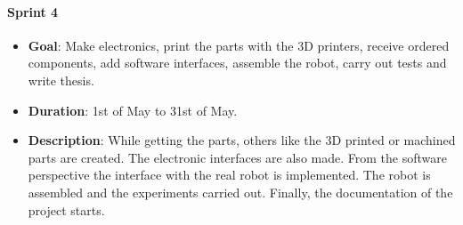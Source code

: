 \paragraph{\textbf{Sprint 4}}
  \begin{itemize}
    \item \textbf{Goal}: Make electronics, print the parts with the 3D printers, receive ordered components, add software interfaces, assemble the robot, carry out tests and write thesis.
    \item \textbf{Duration}: 1st of May to 31st of May.
    \item \textbf{Description}: While getting the parts, others like the 3D printed or machined parts are created. The electronic interfaces are also made. From the software perspective the interface with the real robot is implemented. The robot is assembled and the experiments carried out. Finally, the documentation of the project starts.
  \end{itemize}

